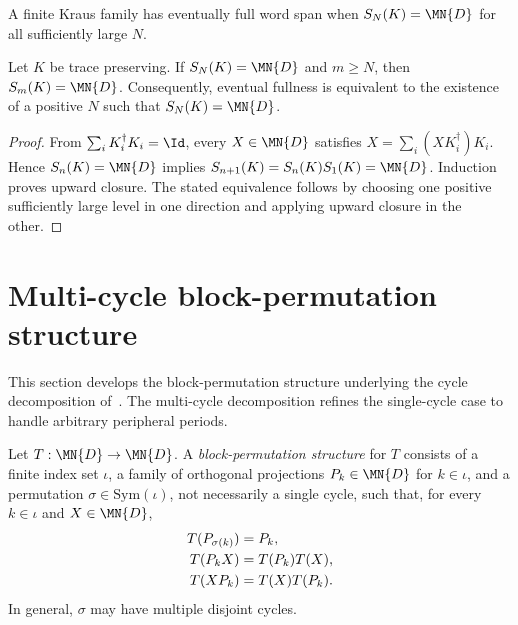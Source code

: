 \begin{definition}
    \label{def:kraus_eventually_full_word_span}
    \leanok
    A finite Kraus family has eventually full word span when
    $S_N(K)=\MN{D}$ for all sufficiently large $N$.
\end{definition}

\begin{theorem}
    \label{thm:kraus_word_span_upward_tp}
    \leanok
    Let $K$ be trace preserving. If $S_N(K)=\MN{D}$ and $m\geq N$, then
    $S_m(K)=\MN{D}$. Consequently, eventual fullness is equivalent to the
    existence of a positive $N$ such that $S_N(K)=\MN{D}$.
\end{theorem}

\begin{proof}
    \leanok
    From $\sum_iK_i^\dagger K_i=\Id$, every $X\in\MN{D}$ satisfies
    $X=\sum_i(XK_i^\dagger)K_i$. Hence $S_n(K)=\MN{D}$ implies
    $S_{n+1}(K)=S_n(K)S_1(K)=\MN{D}$. Induction proves upward closure.
    The stated equivalence follows by choosing one positive sufficiently
    large level in one direction and applying upward closure in the other.
\end{proof}

\section{Multi-cycle block-permutation structure}

This section develops the block-permutation structure underlying the
cycle decomposition of~\cite[Theorem~6.16]{Wolf2012Quantum}. The
multi-cycle decomposition refines the single-cycle case to handle
arbitrary peripheral periods.

\begin{definition}
    \label{def:cycle_structure}
    \leanok
    Let $T:\MN{D}\to\MN{D}$. A \emph{block-permutation structure} for
    $T$ consists of a finite index set $\iota$, a family of orthogonal
    projections $P_k\in\MN{D}$ for $k\in\iota$, and a permutation
    $\sigma\in\mathrm{Sym}(\iota)$, not necessarily a single cycle, such
    that, for every $k\in\iota$ and $X\in\MN{D}$,
    \begin{align}
        T(P_{\sigma(k)}) & =P_k, \notag        \\
        T(P_kX)          & =T(P_k)T(X), \notag \\
        T(XP_k)          & =T(X)T(P_k).
        \notag
    \end{align}
    In general, $\sigma$ may have multiple disjoint cycles.
\end{definition}

